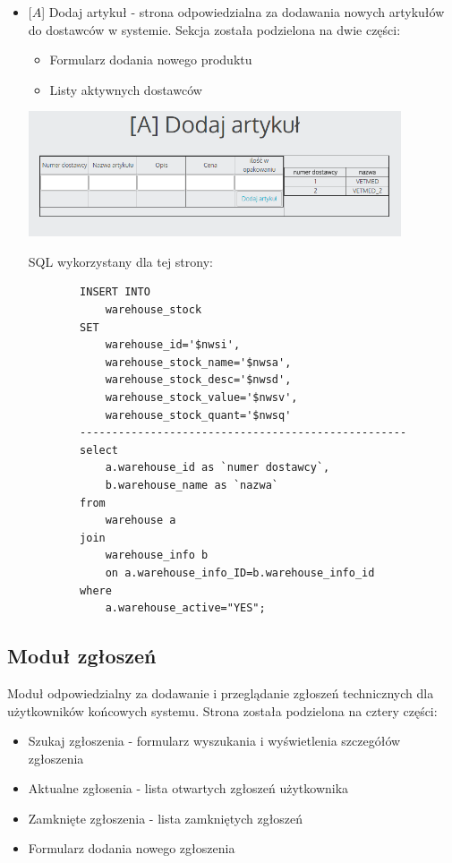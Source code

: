 \documentclass[10pt,a4paper]{article}
\begin{document}
\begin{itemize}
\begin{lstlisting}
		
		\end{lstlisting}
		
		
		\item $[A$] Dodaj artykuł - strona odpowiedzialna za dodawania nowych artykułów do dostawców w systemie. Sekcja została podzielona na dwie części:
		
			\begin{itemize}
				\item Formularz dodania nowego produktu
				\item Listy aktywnych dostawców
			\end{itemize}
		
	\includegraphics[width=11cm]{15}
		
		SQL wykorzystany dla tej strony:
		\begin{lstlisting}
		INSERT INTO 
			warehouse_stock 
		SET 
			warehouse_id='$nwsi', 
			warehouse_stock_name='$nwsa',  
			warehouse_stock_desc='$nwsd', 
			warehouse_stock_value='$nwsv', 
			warehouse_stock_quant='$nwsq' 
		---------------------------------------------------
		select 
			a.warehouse_id as `numer dostawcy`,
			b.warehouse_name as `nazwa`
		from 
			warehouse a 
		join 
			warehouse_info b 
			on a.warehouse_info_ID=b.warehouse_info_id 
		where 
			a.warehouse_active="YES";
		\end{lstlisting}
		
	\end{itemize}
\newpage
\subsection{Moduł zgłoszeń}
	Moduł odpowiedzialny za dodawanie i przeglądanie zgłoszeń technicznych dla użytkowników końcowych systemu. Strona została podzielona na cztery części:
	\begin{itemize}
		\item Szukaj zgłoszenia - formularz wyszukania i wyświetlenia szczegółów zgłoszenia
		\item Aktualne zgłosenia - lista otwartych zgłoszeń użytkownika
		\item Zamknięte zgłoszenia - lista zamkniętych zgłoszeń
		\item Formularz dodania nowego zgłoszenia
	\end{itemize}
\end{document}
